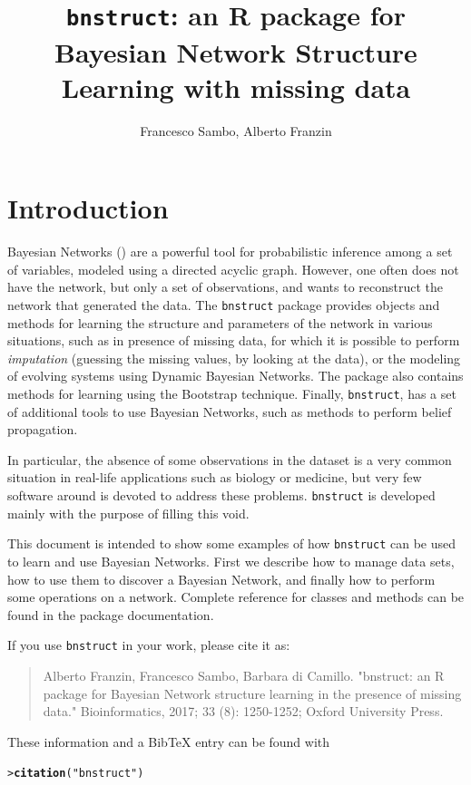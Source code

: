 \documentclass{article}\usepackage[]{graphicx}\usepackage[]{color}
\makeatletter
\newcommand{\hlstr}[1]{\textcolor[rgb]{0.192,0.494,0.8}{#1}}%
\newcommand{\hlstd}[1]{\textcolor[rgb]{0.345,0.345,0.345}{#1}}%
\newcommand{\hlkwd}[1]{\textcolor[rgb]{0.737,0.353,0.396}{\textbf{#1}}}%
\newenvironment{kframe}{%
 \def\at@end@of@kframe{}%
 \ifinner\ifhmode%
  \def\at@end@of@kframe{\end{minipage}}%
  \begin{minipage}{\columnwidth}%
 \fi\fi%
 \def\FrameCommand##1{\hskip\@totalleftmargin \hskip-\fboxsep
 \colorbox{shadecolor}{##1}\hskip-\fboxsep
     \hskip-\linewidth \hskip-\@totalleftmargin \hskip\columnwidth}%
 \MakeFramed {\advance\hsize-\width
   \@totalleftmargin\z@ \linewidth\hsize
   \@setminipage}}%
 {\par\unskip\endMakeFramed%
 \at@end@of@kframe}
\newenvironment{knitrout}{}{} %
\newcommand{\Rpackage}[1]{{\texttt{#1}}}
\makeatother
\begin{document}
\title{\texttt{bnstruct}: an R package for Bayesian Network Structure Learning with missing data}
\author{Francesco Sambo, Alberto Franzin}
\maketitle

\tableofcontents



\section{Introduction}
Bayesian Networks (\citet{pearl1988probabilistic}) are a powerful tool for probabilistic inference among a set
of variables, modeled using a directed acyclic graph. However, one often does not
have the network, but only a set of observations, and wants to reconstruct the
network that generated the data. The \Rpackage{bnstruct} package provides objects and methods for
learning the structure and parameters of the network in various situations, such as
in presence of missing data, for which it is possible to perform \textit{imputation}
(guessing the missing values, by looking at the data), or the modeling of
evolving systems using Dynamic Bayesian Networks. The package also contains methods
for learning using the Bootstrap technique.
Finally, \Rpackage{bnstruct}, has a set of additional tools to use Bayesian Networks, such as methods to perform
belief propagation.

In particular, the absence of some observations in the dataset is a very common situation in real-life
applications such as biology or medicine, but very few software around is devoted to address these problems.
\Rpackage{bnstruct} is developed mainly with the purpose of filling this void.

This document is intended to show some examples of how \Rpackage{bnstruct} can be used
to learn and use Bayesian Networks. First we describe how to manage data sets,
how to use them to discover a Bayesian Network, and finally how to perform some
operations on a network. Complete reference for classes and methods can be found in the package documentation.

If you use \Rpackage{bnstruct} in your work, please cite it as:
\begin{quote}
Alberto Franzin, Francesco Sambo, Barbara di Camillo. "bnstruct: an R package for Bayesian Network structure learning in the presence of missing data." Bioinformatics, 2017; 33 (8): 1250-1252; Oxford University Press.
\end{quote}
These information and a BibTeX entry can be found with
\begin{knitrout}
\color{fgcolor}\begin{kframe}
\begin{alltt}
\hlstd{> }\hlkwd{citation}\hlstd{(}\hlstr{"bnstruct"}\hlstd{)}
\end{alltt}
\end{kframe}
\end{knitrout}
\end{document}
